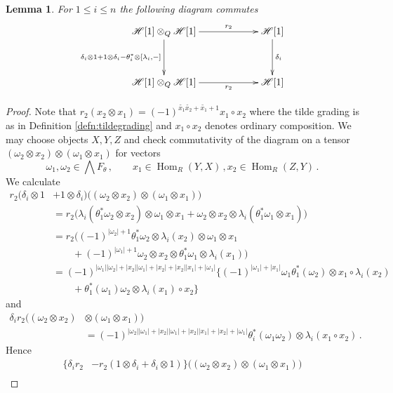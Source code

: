 \documentclass[english,letter paper,12pt,leqno]{article}
\newtheorem{lemma}[theorem]{Lemma}
\theoremstyle{example}
\numberwithin{equation}{section}
\def\Hom{\operatorname{Hom}}
\def\be{\begin{equation}}
\def\ee{\end{equation}}
\begin{document}
\begin{lemma}\label{lemma_p_9} For $1 \le i \le n$ the following diagram commutes
\be
\xymatrix@C+3pc@R+1pc{
\mathscr{H}[1] \otimes_Q \mathscr{H}[1] \ar[d]_-{\delta_i \otimes 1 + 1 \otimes \delta_i - \theta_i^* \otimes [\lambda_i,-]} \ar[r]^-{r_2} & \mathscr{H}[1] \ar[d]^-{\delta_i}\\
\mathscr{H}[1] \otimes_Q \mathscr{H}[1] \ar[r]_-{r_2} & \mathscr{H}[1]
}
\ee
\end{lemma}
\begin{proof}
Note that $r_2( x_2 \otimes x_1 ) = (-1)^{\widetilde{x_1}\widetilde{x_2} + \widetilde{x_1} + 1} x_1 \circ x_2$ where the tilde grading is as in Definition \ref{defn:tildegrading} and $x_1 \circ x_2$ denotes ordinary composition. We may choose objects $X,Y,Z$ and check commutativity of the diagram on a tensor $(\omega_2 \otimes x_2) \otimes (\omega_1 \otimes x_1)$ for vectors
\[
\omega_1,\omega_2 \in \bigwedge F_\theta \,, \qquad x_1 \in \Hom_R(Y,X)\,, x_2 \in \Hom_R(Z,Y)\,.
\]
We calculate
\begin{align*}
r_2( \delta_i \otimes 1 &+ 1 \otimes \delta_i )\big( (\omega_2 \otimes x_2) \otimes (\omega_1 \otimes x_1) \big)\\
&= r_2 \big( \lambda_i( \theta_1^* \omega_2 \otimes x_2 ) \otimes \omega_1 \otimes x_1 + \omega_2 \otimes x_2 \otimes \lambda_i( \theta_1^* \omega_1 \otimes x_1) \big)\\
&= r_2 \big( (-1)^{|\omega_2| + 1} \theta_1^* \omega_2 \otimes \lambda_i(x_2) \otimes \omega_1 \otimes x_1\\
&\qquad + (-1)^{|\omega_1|+1} \omega_2 \otimes x_2 \otimes \theta_1^* \omega_1 \otimes \lambda_i(x_1) \big)\\
&= (-1)^{|\omega_1||\omega_2| + |x_2||\omega_1| + |x_2| + |x_2||x_1| + |\omega_1|} \big\{ (-1)^{|\omega_1| + |x_1|} \omega_1 \theta_1^*( \omega_2 ) \otimes x_1 \circ \lambda_i( x_2 )\\
&\qquad + \theta_1^*(\omega_1) \omega_2 \otimes \lambda_i(x_1) \circ x_2 \big\}
\end{align*}
and
\begin{align*}
\delta_i r_2\big( (\omega_2 \otimes x_2) &\otimes (\omega_1 \otimes x_1) \big)\\
&= (-1)^{|\omega_2||\omega_1| + |x_2||\omega_1| + |x_2||x_1| + |x_2| + |\omega_1|} \theta_i^*( \omega_1 \omega_2 ) \otimes \lambda_i(x_1 \circ x_2)\,.
\end{align*}
Hence
\begin{align*}
\Big\{ \delta_i r_2 &- r_2( 1 \otimes \delta_i + \delta_i \otimes 1) \Big\}\big( (\omega_2 \otimes x_2) \otimes (\omega_1 \otimes x_1) \big)\\

\end{align*}
\end{proof}
\end{document}
